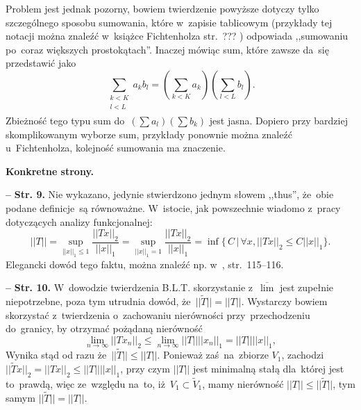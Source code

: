 \documentclass[a4paper,11pt]{article}
\newcommand{\spaceTwo}{1em}
\newcommand{\spaceThree}{0.5em}
\newcommand{\fr}{\frac}
\newcommand{\ol}{\overline}
\newcommand{\wt}{\widetilde}
\newcommand{\ra}{\rightarrow}
\newcommand{\Lim}{\lim\limits}
\newcommand{\Limsup}{\ol{\lim}}
\newcommand{\Sum}{\sum\limits}
\newcommand{\norm}[1]{\left|\left| #1 \right|\right|}
\newcommand{\tb}{\textbf}
\newcommand{\noi}{\noindent}
\newcommand{\start}{\noi \tb{--} {}}
\newcommand{\Str}[1]{\tb{Str. #1.}}
\begin{document}
Problem jest jednak pozorny, bowiem twierdzenie powyższe dotyczy tylko
szczególnego sposobu sumowania, które w~zapisie tablicowym (przykłady
tej notacji można znaleźć w~książce Fichtenholza str.~???
\cite{Fichtenholz04}) odpowiada ,,sumowaniu po~coraz większych
prostokątach''. Inaczej mówiąc sum, które zawsze da~się przedstawić
jako
\begin{equation*}
  \Sum_{ \substack{ k < K \\ l < L \\ } } a_{ k } b_{ l }
  = ( \Sum_{ k < K } a_{ k } ) ( \Sum_{ l < L } b_{ l } ).
\end{equation*}
Zbieżność tego typu sum do~$( \Sum a_{ l } ) ( \Sum b_{ k } )$ jest
jasna. Dopiero przy bardziej skomplikowanym wyborze sum, przykłady
ponownie można znaleźć u~Fichtenholza, kolejność sumowania ma
znaczenie.

\vspace{\spaceTwo}



\noi \tb{Konkretne strony.}

\vspace{\spaceThree}


\start \Str{9} Nie wykazano, jedynie stwierdzono jednym słowem
,,thus'', że~obie podane definicje~są równoważne. W~istocie, jak
powszechnie wiadomo z~pracy dotyczących analizy funkcjonalnej:
\begin{displaymath}
  \norm{ T } = \sup_{ \norm{ x }_{ 1 } \leq 1 } \fr{ \norm{ T x }_{ 2 } }
  { \norm{ x }_{ 1 } }
  = \sup_{ \norm{ x }_{ 1 } = 1 } \fr{ \norm{ T x }_{ 2 } }
  { \norm{ x }_{ 1 } } = \inf \{ \, C \, | \, \forall x,
  \norm{ T x }_{ 2 } \leq C \norm{ x }_{ 1 } \}.
\end{displaymath}
Elegancki dowód tego faktu, można znaleźć np. w~\cite{Chmielinski04},
str.~115--116.

\start \Str{10} W~dowodzie twierdzenia B.L.T. skorzystanie z~$\Limsup$
jest zupełnie niepotrzebne, poza tym utrudnia dowód,
że~$|| \tilde{ T } || = \norm{ T }$. Wystarczy bowiem skorzystać
z~twierdzenia o~zachowaniu nierówności przy~przechodzeniu do~granicy,
by otrzymać pożądaną nierówność
\begin{displaymath}
  \Lim_{ n \ra \infty } \norm{ T x_{ n } }_{ 2 }
  \leq \Lim_{ n \ra \infty } \norm{ T } \norm{ x_{ n } }_{ 1 }
  = \norm{ T } \norm{ x }_{ 1 },
\end{displaymath}
Wynika stąd od razu że~$|| \wt{ T } || \leq \norm{ T }$. Ponieważ
zaś~na~zbiorze $V_{ 1 }$, zachodzi
$|| \wt{ T } x ||_{ 2 } = \norm{ T x }_{ 2 } \leq \norm{ T } \norm{ x
}_{ 1 }$, przy czym $\norm{ T }$ jest minimalną stałą dla~której jest
to~prawdą, więc ze~względu na~to, iż~$V_{ 1 } \subset \wt{ V }_{ 1 }$,
mamy nierówność $\norm{ T } \leq || \wt{ T } ||$, tym samym
$|| \wt{ T } || = \norm{ T }$.
\end{document}
